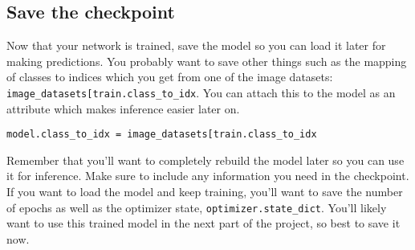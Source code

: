 \documentclass[11pt]{article}
\begin{document}
    \hypertarget{save-the-checkpoint}{%
\subsection{Save the checkpoint}\label{save-the-checkpoint}}

Now that your network is trained, save the model so you can load it
later for making predictions. You probably want to save other things
such as the mapping of classes to indices which you get from one of the
image datasets:
\texttt{image\_datasets{[}\textquotesingle{}train\textquotesingle{}{]}.class\_to\_idx}.
You can attach this to the model as an attribute which makes inference
easier later on.

\texttt{model.class\_to\_idx\ =\ image\_datasets{[}\textquotesingle{}train\textquotesingle{}{]}.class\_to\_idx}

Remember that you'll want to completely rebuild the model later so you
can use it for inference. Make sure to include any information you need
in the checkpoint. If you want to load the model and keep training,
you'll want to save the number of epochs as well as the optimizer state,
\texttt{optimizer.state\_dict}. You'll likely want to use this trained
model in the next part of the project, so best to save it now.
\end{document}
